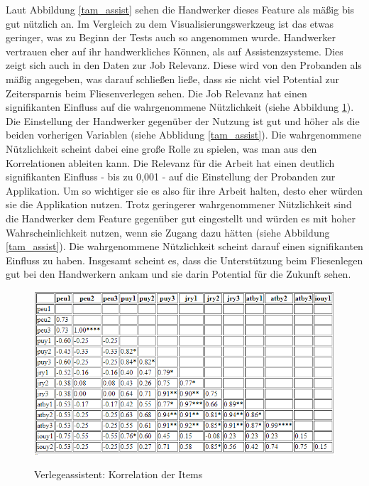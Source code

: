 Laut Abbildung \ref{tam_assist} sehen die Handwerker dieses Feature als mäßig bis gut nützlich an. Im Vergleich zu dem Visualisierungswerkzeug ist das etwas geringer, was zu Beginn der Tests auch so angenommen wurde. Handwerker vertrauen eher auf ihr handwerkliches Können, als auf Assistenzsysteme. Dies zeigt sich auch in den Daten zur Job Relevanz. Diese wird von den Probanden als mäßig angegeben, was darauf schließen ließe, dass sie nicht viel Potential zur Zeitersparnis beim Fliesenverlegen sehen. Die Job Relevanz hat einen signifikanten Einfluss auf die wahrgenommene Nützlichkeit (siehe Abbildung \ref{tam_assistCor}). Die Einstellung der Handwerker gegenüber der Nutzung ist gut und höher als die beiden vorherigen Variablen (siehe Abblidung \ref{tam_assist}). Die wahrgenommene Nützlichkeit scheint dabei eine große Rolle zu spielen, was man aus den Korrelationen ableiten kann. Die Relevanz für die Arbeit hat einen deutlich signifikanten Einfluss - bis zu 0,001 - auf die Einstellung der Probanden zur Applikation. Um so wichtiger sie es also für ihre Arbeit halten, desto eher würden sie die Applikation nutzen. Trotz geringerer wahrgenommener Nützlichkeit sind die Handwerker dem Feature gegenüber gut eingestellt und würden es mit hoher Wahrscheinlichkeit nutzen, wenn sie Zugang dazu hätten (siehe Abbildung \ref{tam_assist}). Die wahrgenommene Nützlichkeit scheint darauf einen signifikanten Einfluss zu haben. Insgesamt scheint es, dass die Unterstützung beim Fliesenlegen gut bei den Handwerkern ankam und sie darin Potential für die Zukunft sehen.

\begin{figure}[h]
	\begin{center}
		\includegraphics[scale=0.7]{Resources/Evaluation/cor_assist.png}
		\label{tam_assistCor}
		\caption{Verlegeassistent: Korrelation der Items}	
	\end{center}
\end{figure}

